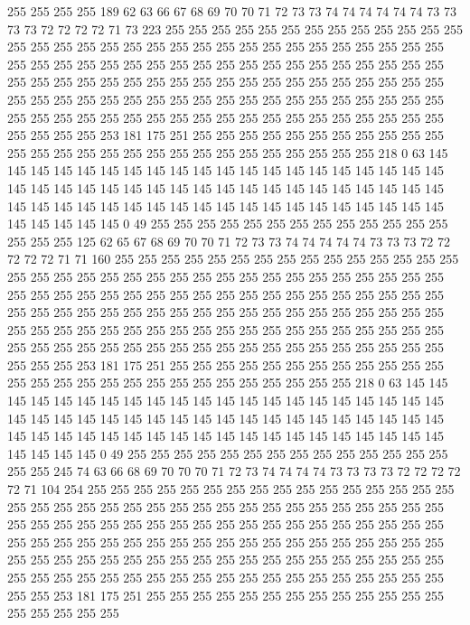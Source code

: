255 255 255 255 189 62 63 66 67 68 69 70 70 71 72 73 73 74 74 74
74 74 74 73 73 73 73 72 72 72 72 71 73 223 255 255 255 255 255 255
255 255 255 255 255 255 255 255 255 255 255 255 255 255 255 255 255 255 255 255
255 255 255 255 255 255 255 255 255 255 255 255 255 255 255 255 255 255 255 255
255 255 255 255 255 255 255 255 255 255 255 255 255 255 255 255 255 255 255 255
255 255 255 255 255 255 255 255 255 255 255 255 255 255 255 255 255 255 255 255
255 255 255 255 255 255 255 255 255 255 255 255 255 255 255 255 255 255 255 255
255 255 255 255 255 255 253 181 175 251 255 255 255 255 255 255 255 255 255 255
255 255 255 255 255 255 255 255 255 255 255 255 255 255 255 255 255 218 0 63
145 145 145 145 145 145 145 145 145 145 145 145 145 145 145 145 145 145 145 145
145 145 145 145 145 145 145 145 145 145 145 145 145 145 145 145 145 145 145 145
145 145 145 145 145 145 145 145 145 145 145 145 145 145 145 145 145 145 145 145
145 145 145 0 49 255 255 255 255 255 255 255 255 255 255 255 255 255 255 255
255 125 62 65 67 68 69 70 70 71 72 73 73 74 74 74 74 74 73 73
73 72 72 72 72 72 71 71 160 255 255 255 255 255 255 255 255 255 255 255
255 255 255 255 255 255 255 255 255 255 255 255 255 255 255 255 255 255 255 255
255 255 255 255 255 255 255 255 255 255 255 255 255 255 255 255 255 255 255 255
255 255 255 255 255 255 255 255 255 255 255 255 255 255 255 255 255 255 255 255
255 255 255 255 255 255 255 255 255 255 255 255 255 255 255 255 255 255 255 255
255 255 255 255 255 255 255 255 255 255 255 255 255 255 255 255 255 255 255 255
255 255 253 181 175 251 255 255 255 255 255 255 255 255 255 255 255 255 255 255
255 255 255 255 255 255 255 255 255 255 255 255 255 218 0 63 145 145 145 145
145 145 145 145 145 145 145 145 145 145 145 145 145 145 145 145 145 145 145 145
145 145 145 145 145 145 145 145 145 145 145 145 145 145 145 145 145 145 145 145
145 145 145 145 145 145 145 145 145 145 145 145 145 145 145 145 145 145 145 0
49 255 255 255 255 255 255 255 255 255 255 255 255 255 255 255 255 245 74 63
66 68 69 70 70 70 71 72 73 74 74 74 74 73 73 73 73 72 72 72
72 72 71 104 254 255 255 255 255 255 255 255 255 255 255 255 255 255 255 255
255 255 255 255 255 255 255 255 255 255 255 255 255 255 255 255 255 255 255 255
255 255 255 255 255 255 255 255 255 255 255 255 255 255 255 255 255 255 255 255
255 255 255 255 255 255 255 255 255 255 255 255 255 255 255 255 255 255 255 255
255 255 255 255 255 255 255 255 255 255 255 255 255 255 255 255 255 255 255 255
255 255 255 255 255 255 255 255 255 255 255 255 255 255 255 255 255 255 253 181
175 251 255 255 255 255 255 255 255 255 255 255 255 255 255 255 255 255 255 255
